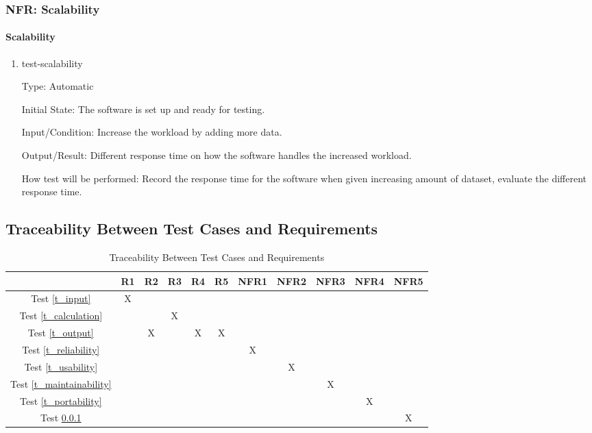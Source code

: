 \documentclass[12pt, titlepage]{article}
\begin{document}
\subsubsection{NFR: Scalability}\label{t_scalability}
		
\paragraph{Scalability}

\begin{enumerate}

\item{test-scalability}

Type: Automatic
					
Initial State: The software is set up and ready for testing.
					
Input/Condition: Increase the workload by adding more data.
					
Output/Result: Different response time on how the software handles the increased workload.
					
How test will be performed: Record the response time for the software when given increasing amount of dataset, evaluate the different response time.

\end{enumerate}

\subsection{Traceability Between Test Cases and Requirements}

\begin{table}[h]
\centering
\begin{tabular}{|c|c|c|c|c|c|c|c|c|c|c|}
\hline
	& R1 & R2 & R3 & R4 & R5 & NFR1 & NFR2 & NFR3 & NFR4 & NFR5 \\
\hline
Test \ref{t_input}        & X & & & & & & & & & \\ \hline
Test \ref{t_calculation}        & & & X & & & & & & & \\ \hline
Test \ref{t_output}        & & X & & X & X & & & & & \\ \hline
Test \ref{t_reliability}        & & & & & & X & & & & \\ \hline
Test \ref{t_usability}        & & & & & & & X & & & \\ \hline
Test \ref{t_maintainability}        & & & & & & & & X & & \\ \hline
Test \ref{t_portability}        & & & & & & & & & X & \\ \hline
Test \ref{t_scalability}        & & & & & & & & & & X \\ \hline
\end{tabular}
\caption{Traceability Between Test Cases and Requirements}
\label{Table:test_requirements}
\end{table}
\end{document}
